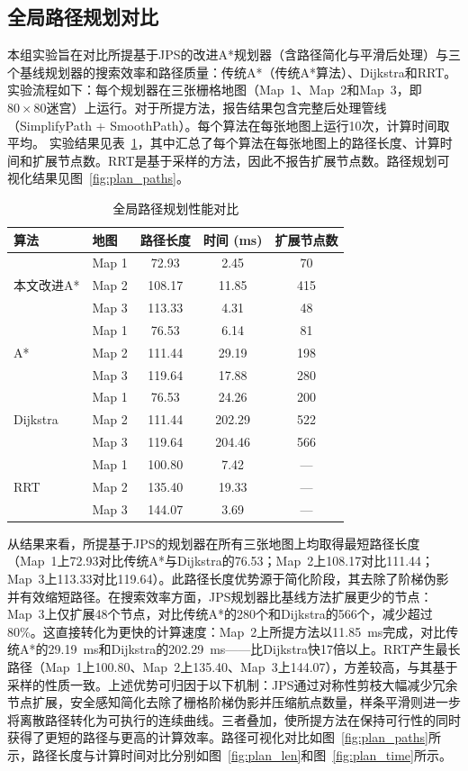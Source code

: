 \documentclass[lettersize,journal]{IEEEtran}
\begin{document}
\subsection{全局路径规划对比}
\label{subsec:exp_plan}
本组实验旨在对比所提基于JPS的改进A*规划器（含路径简化与平滑后处理）与三个基线规划器的搜索效率和路径质量：传统A*（传统A*算法）、Dijkstra和RRT。
实验流程如下：每个规划器在三张栅格地图（Map~1、Map~2和Map~3，即$80\times 80$迷宫）上运行。对于所提方法，报告结果包含完整后处理管线（SimplifyPath + SmoothPath）。每个算法在每张地图上运行10次，计算时间取平均。
实验结果见表~\ref{tab:plan}，其中汇总了每个算法在每张地图上的路径长度、计算时间和扩展节点数。RRT是基于采样的方法，因此不报告扩展节点数。路径规划可视化结果见图~\ref{fig:plan_paths}。
\begin{table}[!t]
\caption{全局路径规划性能对比}
\label{tab:plan}
\centering
\footnotesize
\begin{tabular}{llccc}
\toprule
算法 & 地图 & 路径长度 & 时间 (ms) & 扩展节点数 \\
\midrule
\multirow{3}{*}{本文改进A*}
& Map 1 & 72.93 & 2.45 & 70 \\
& Map 2 & 108.17 & 11.85 & 415 \\
& Map 3 & 113.33 & 4.31 & 48 \\
\midrule
\multirow{3}{*}{A*}
& Map 1 & 76.53 & 6.14 & 81 \\
& Map 2 & 111.44 & 29.19 & 198 \\
& Map 3 & 119.64 & 17.88 & 280 \\
\midrule
\multirow{3}{*}{Dijkstra}
& Map 1 & 76.53 & 24.26 & 200 \\
& Map 2 & 111.44 & 202.29 & 522 \\
& Map 3 & 119.64 & 204.46 & 566 \\
\midrule
\multirow{3}{*}{RRT}
& Map 1 & 100.80 & 7.42 & --- \\
& Map 2 & 135.40 & 19.33 & --- \\
& Map 3 & 144.07 & 3.69 & --- \\
\bottomrule
\end{tabular}
\end{table}
从结果来看，所提基于JPS的规划器在所有三张地图上均取得最短路径长度（Map~1上72.93对比传统A*与Dijkstra的76.53；Map~2上108.17对比111.44；Map~3上113.33对比119.64）。此路径长度优势源于简化阶段，其去除了阶梯伪影并有效缩短路径。在搜索效率方面，JPS规划器比基线方法扩展更少的节点：Map~3上仅扩展48个节点，对比传统A*的280个和Dijkstra的566个，减少超过80\%。这直接转化为更快的计算速度：Map~2上所提方法以11.85~ms完成，对比传统A*的29.19~ms和Dijkstra的202.29~ms——比Dijkstra快17倍以上。RRT产生最长路径（Map~1上100.80、Map~2上135.40、Map~3上144.07），方差较高，与其基于采样的性质一致。上述优势可归因于以下机制：JPS通过对称性剪枝大幅减少冗余节点扩展，安全感知简化去除了栅格阶梯伪影并压缩航点数量，样条平滑则进一步将离散路径转化为可执行的连续曲线。三者叠加，使所提方法在保持可行性的同时获得了更短的路径与更高的计算效率。路径可视化对比如图~\ref{fig:plan_paths}所示，路径长度与计算时间对比分别如图~\ref{fig:plan_len}和图~\ref{fig:plan_time}所示。
\end{document}
